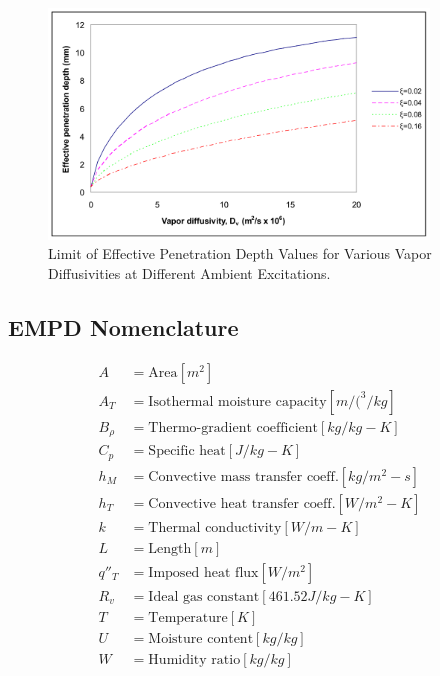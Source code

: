 \begin{figure}[hbtp] %
\centering
\includegraphics[width=0.9\textwidth, height=0.9\textheight, keepaspectratio=true]{media/image241.svg.png}
\caption{Limit of Effective Penetration Depth Values for Various Vapor Diffusivities at Different Ambient Excitations. \protect \label{fig:limit-of-effective-penetration-depth-values}}
\end{figure}

\subsection{EMPD Nomenclature}\label{empd-nomenclature}
\begin{align*}  
  A  &= \text{Area} [m^{2}] \\
  A_{T}  &= \text{Isothermal moisture capacity} [m/(^{3}/kg] \\
  B_{\rho}  &= \text{Thermo-gradient coefficient} [kg/kg-K] \\
  C_{p}  &= \text{Specific heat} [J/kg-K] \\
  h_{M}  &= \text{Convective mass transfer coeff.} [kg/m^{2}-s] \\
  h_{T}  &= \text{Convective heat transfer coeff.} [W/m^{2}-K] \\
  k  &= \text{Thermal conductivity} [W/m-K] \\
  L  &= \text{Length} [m] \\
  q''_{T}  &= \text{Imposed heat flux} [W/m^{2}] \\
  R_{v}  &= \text{Ideal gas constant} [461.52 J/kg-K] \\
  T  &= \text{Temperature} [K] \\
  U  &= \text{Moisture content} [kg/kg] \\
  W  &= \text{Humidity ratio} [kg/kg]
\end{align*}

